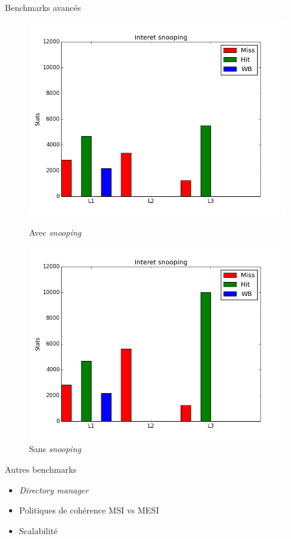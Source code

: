\begin{frame}{Benchmarks avanc\'es}
\begin{figure}[H]
   \begin{minipage}[l]{.46\textwidth}
     \includegraphics[scale=0.22]{images/stats_falsesharing_snooping.png}
     \caption{Avec \emph{snooping}}
   \end{minipage} \hfill
   \begin{minipage}[r]{.46\textwidth}
     \includegraphics[scale=0.22]{images/stats_falsesharing_no_snooping.png}
     \caption{Sans \emph{snooping}}
   \end{minipage}
\end{figure}
  \begin{block}{Autres benchmarks}
    \begin{itemize}
      \item \emph{Directory manager}
      \item Politiques de coh\'erence MSI vs MESI
      \item Scalabilit\'e
    \end{itemize}
  \end{block}
\end{frame}

